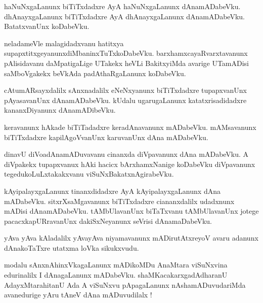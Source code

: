 \documentclass{article}
\begin{document}
\begin{mn}%
haNuNxgaLanunx biTiTxdadxre AyA haNuNxgaLanunx dAnamADabeVku. dhAnayxgaLanunx biTiTxdadxre AyA 
dhAnayxgaLanunx dAnamADabeVku. BatatxvanUnx koDabeVku.
\end{mn}

\begin{mn}%
neladameVle malagidadxvanu hatitxya supapxtitxgeyanunxdiMbaninxTuTxkoDabeVku. 
barxhamxcayaRvarxtavanunx pAlisidavanu daMpatigaLige UTakekx heVLi BakitxyiMda avarige UTamADisi 
saMboVgakekx beVkAda padAthaRgaLanunx koDabeVku.
\end{mn}

\begin{mn}%
cAtumARsayxdalilx sAnxnadalilx eNeNxyanunx biTiTxdadxre tupapxvanUnx pAyasavanUnx dAnamADabeVku. 
kUdalu ugarugaLanunx katatxrisadidadxre kananxDiyanunx dAnamADibeVku.
\end{mn}

\begin{mn}%
keravanunx hAkade biTiTadadxre keradAnavanunx mADabeVku. mAMsavanunx biTiTxdadxre kapilAgoVvanUnx 
karuvanUnx dAna mADabeVku.
\end{mn}

\begin{mn}%
dinavU diVoadAnamADuvavanu cinanxda diVpavanunx dAna mADabeVku. A diVpakekx tupapxvanux hAki hacicx 
bArxhamxNanige koDabeVku diVpavanunx tegedukoLuLxtakakxvanu viSuNxBakatxnAgirabeVku.
\end{mn}

\begin{mn}%
kAyipalayxgaLanunx tinanxdidadxre AyA kAyipalayxgaLanunx dAna mADabeVku. sitxrXsaMgavanunx 
biTiTxdadxre ciananxdalilx udadxnunx mADisi dAnamADabeVku. tAMbUlavanUnx biTaTxvanu tAMbUlavanUnx 
jotege pacacxkapURravanUnx dakiSxNeyanunx seVrisi dAnamaDabeVku.
\end{mn}

\begin{mn}%
yAva yAva kAladalilx yAvayAva niyamavanunx mADirutAtxreyoV avaru adanunx dAnakoTaTxre utatxma loVka 
sikukxvudu.
\end{mn}

\begin{mn}%
modalu sAnxnAhinxVkagaLanunx mADikoMDu AnaMtara viSuNxvina edurinalilx I dAnagaLanunx mADabeVku. 
shaMKacakarxgadAdharanU AdayxMtarahitanU Ada A viSuNxvu pApagaLanunx nAshamADuvudariMda 
avanedurige yAru tAneV dAna mADuvudilalx !
\end{mn}
\end{document}
